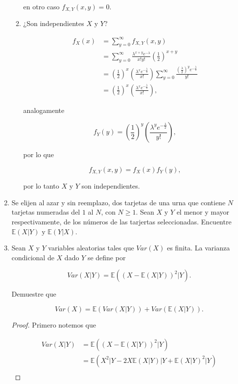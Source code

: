 \documentclass[letterpaper]{article}
\theoremstyle{definition}
\theoremstyle{lemathm}
\theoremstyle{lemathm}
\theoremstyle{lemathm}
\theoremstyle{lemademthm}
\newcommand{\txty}{\text{ y }}
\newcommand{\pars}[1]{\left( #1 \right) }
\newcommand{\EE}{\mathbb{E}}
\newcommand{\1}{\mathbbm{1}}
\begin{document}
\begin{enumerate}
\begin{enumerate}
			en otro caso $f_{X,Y}\pars{x,y} = 0$.

			\item ¿Son independientes $X$ y $Y$?
			
			\begin{align*}
				f_X\pars{x} &= \sum_{y=0}^{\infty} f_{X,Y}\pars{x,y}\\
				&= \sum_{y=0}^{\infty} \frac{\lambda^{x+y}e^{-\lambda}}{x!y!} \pars{\frac{1}{2}}^{x+y}\\
				&= \pars{\frac{1}{2}}^{x} \pars{\frac{\lambda^xe^{-\frac{\lambda}{2}}}{x!}} \sum_{y=0}^{\infty} \frac{\pars{\frac{\lambda}{2}}^{y}e^{-\frac{\lambda}{2}}}{y!}\\
				&= \pars{\frac{1}{2}}^{x} \pars{\frac{\lambda^xe^{-\frac{\lambda}{2}}}{x!}},
			\end{align*}

			analogamente

			\[f_Y\pars{y} = \pars{\frac{1}{2}}^{y} \pars{\frac{\lambda^ye^{-\frac{\lambda}{2}}}{y!}},\]

			por lo que

			\[f_{X,Y}\pars{x,y} = f_X\pars{x}f_Y\pars{y},\]

			por lo tanto $X$ y $Y$ son independientes.
		\end{enumerate}

		\item Se elijen al azar y sin reemplazo, dos tarjetas de una urna que contiene $N$ tarjetas numeradas del $1$ al $N$, con $N\geq 1$. Sean $X$ y $Y$ el menor y mayor respectivamente, de los números de las tarjertas seleccionadas. Encuentre $\EE\pars{X|Y} \txty \EE\pars{Y|X}$.
		
		\item Sean $X$ y $Y$ variables aleatorias tales que $Var\pars{X}$ es finita. La varianza condicional de $X$ dado $Y$ se define por
		
		\[Var\pars{X|Y} = \EE\pars{\pars{X-\EE\pars{X|Y}}^2|Y}.\]

		Demuestre que

		\[Var\pars{X} = \EE\pars{Var\pars{X|Y}} + Var\pars{\EE\pars{X|Y}}.\]

		\begin{proof}
			Primero notemos que

			\begin{align*}
				Var\pars{X|Y} &= \EE\pars{\pars{X-\EE\pars{X|Y}}^2|Y}\\
				&= \EE\pars{X^2|Y-2X\EE\pars{X|Y}|Y + \EE\pars{X|Y}^2|Y}\\
			\end{align*}
			

\end{proof}
\end{enumerate}
\end{document}
